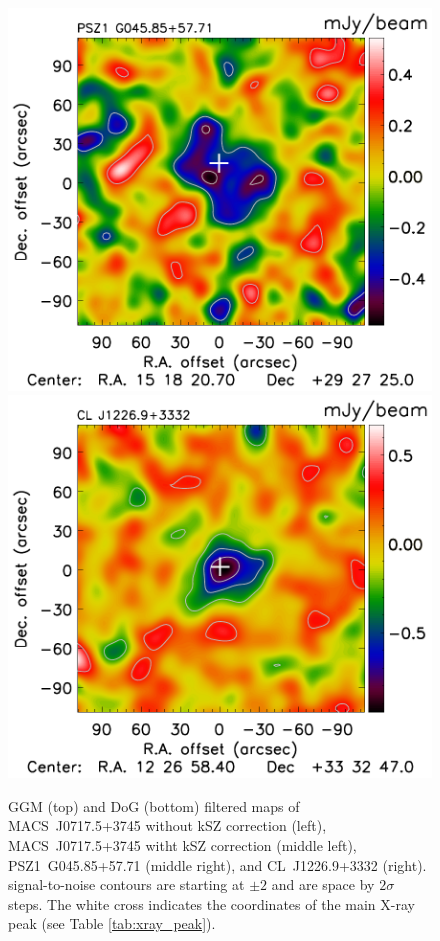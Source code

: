 \documentclass[twocolumn,traditabstract]{aa}
\begin{document}
\begin{figure}[h]
\includegraphics[trim=0cm 0cm 0cm 0cm, clip=true, totalheight=3.8cm]{Figure/DoG_PSZ1G045_15_15_45.pdf}
\includegraphics[trim=0cm 0cm 0cm 0cm, clip=true, totalheight=3.8cm]{Figure/DoG_CLJ1227_15_15_45.pdf}
\caption{\footnotesize{GGM (top) and DoG (bottom) filtered maps of \mbox{MACS~J0717.5+3745} without kSZ correction (left), \mbox{MACS~J0717.5+3745} witht kSZ correction (middle left), \mbox{PSZ1~G045.85+57.71} (middle right), and \mbox{CL~J1226.9+3332} (right). signal-to-noise contours are starting at $\pm 2$ and are space by $2 \sigma$ steps. The white cross indicates the coordinates of the main X-ray peak (see Table \ref{tab:xray_peak}).}}
\label{fig:filtered_NIKA_maps}
\end{figure}
\end{document}
